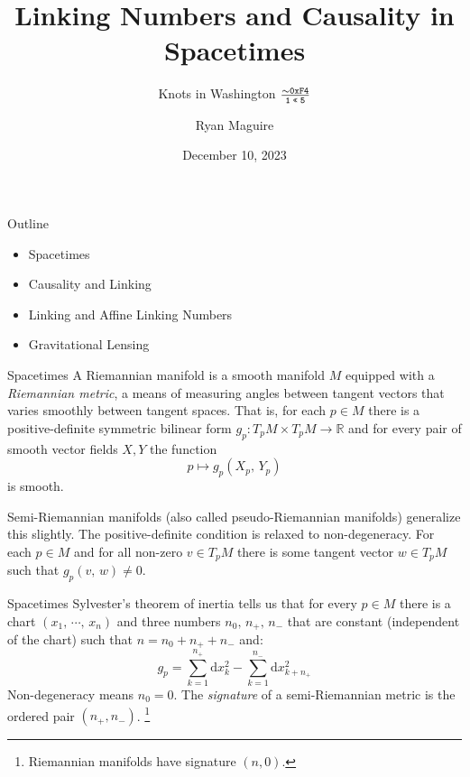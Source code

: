 \documentclass{beamer}
\title{Linking Numbers and Causality in Spacetimes}
\subtitle{Knots in Washington $\frac{\sim\texttt{0xF4}}{\texttt{1\;<<\;5}}$}
\author{Ryan Maguire}
\date{December 10, 2023}
\begin{document}
    \maketitle
    \begin{frame}{Outline}
        \begin{itemize}
            \item Spacetimes
            \item Causality and Linking
            \item Linking and Affine Linking Numbers
            \item Gravitational Lensing
        \end{itemize}
    \end{frame}
    \begin{frame}{Spacetimes}
        A Riemannian manifold is a smooth manifold $M$ equipped with a
        \textit{Riemannian metric}, a means of measuring angles between
        tangent vectors that varies smoothly between tangent spaces. That is,
        for each $p\in{M}$ there is a positive-definite symmetric bilinear form
        $g_{p}:T_{p}M\times{T}_{p}M\rightarrow\mathbb{R}$ and for every pair of
        smooth vector fields $X,Y$ the function
        \begin{equation}
            p\mapsto{g}_{p}(X_{p},\,Y_{p})
        \end{equation}
        is smooth.
        \par\hfill\par
        Semi-Riemannian manifolds (also called pseudo-Riemannian manifolds)
        generalize this slightly. The positive-definite condition is relaxed to
        non-degeneracy. For each $p\in{M}$ and for all non-zero $v\in{T}_{p}M$
        there is some tangent vector $w\in{T}_{p}M$ such that
        $g_{p}(v,\,w)\ne{0}$.
    \end{frame}
    \begin{frame}{Spacetimes}
        Sylvester's theorem of inertia tells us that for every $p\in{M}$
        there is a chart $(x_{1},\,\cdots,\,x_{n})$ and three numbers
        $n_{0},\,n_{+},\,n_{-}$ that are constant (independent of the chart)
        such that $n=n_{0}+n_{+}+n_{-}$ and:
        \begin{equation}
            g_{p}=\sum_{k=1}^{n_{+}}\textrm{d}x_{k}^{2}
                -\sum_{k=1}^{n_{-}}\textrm{d}x_{k+n_{+}}^{2}
        \end{equation}
        Non-degeneracy means $n_{0}=0$. The \textit{signature} of a
        semi-Riemannian metric is the ordered pair $(n_{+},n_{-})$.%
        \footnote{%
            Riemannian manifolds have signature $(n,0)$.
        }
    \end{frame}
\end{document}
